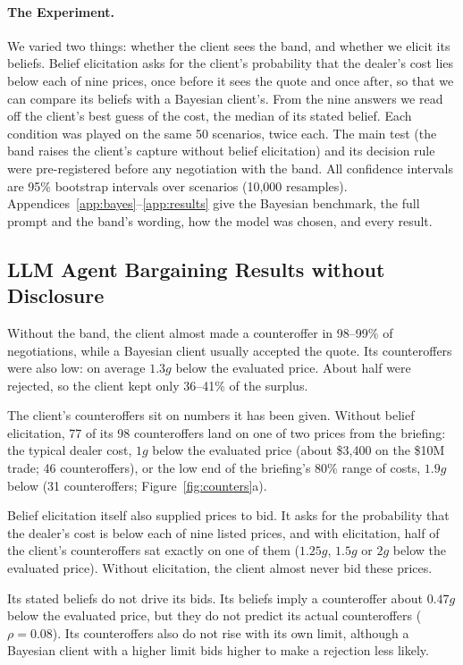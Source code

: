 \documentclass[sigconf]{acmart}
\begin{document}
\paragraph{The Experiment.}
We varied two things: whether the client sees the band, and whether we elicit its beliefs. Belief elicitation asks for the client's probability that the dealer's cost lies below each of nine prices, once before it sees the quote and once after, so that we can compare its beliefs with a Bayesian client's. From the nine answers we read off the client's best guess of the cost, the median of its stated belief. Each condition was played on the same 50 scenarios, twice each. The main test (the band raises the client's capture without belief elicitation) and its decision rule were pre-registered before any negotiation with the band. All confidence intervals are 95\% bootstrap intervals over scenarios (10,000 resamples). Appendices~\ref{app:bayes}--\ref{app:results} give the Bayesian benchmark, the full prompt and the band's wording, how the model was chosen, and every result.


\subsection{LLM Agent Bargaining Results without Disclosure}

Without the band, the client almost made a counteroffer in 98--99\% of negotiations, while a Bayesian client usually accepted the quote. Its counteroffers were also low: on average $1.3g$ below the evaluated price. About half were rejected, so the client kept only 36--41\% of the surplus.

The client's counteroffers sit on numbers it has been given. Without belief elicitation, 77 of its 98 counteroffers land on one of two prices from the briefing: the typical dealer cost, $1g$ below the evaluated price (about \$3,400 on the \$10M trade; 46 counteroffers), or the low end of the briefing's 80\% range of costs, $1.9g$ below (31 counteroffers;
Figure~\ref{fig:counters}a).

Belief elicitation itself also supplied prices to bid. It asks for the probability that the dealer's cost is below each of nine listed prices, and with elicitation, half of the client's counteroffers sat exactly on one of them ($1.25g$, $1.5g$ or $2g$ below the evaluated price). Without elicitation, the client almost never bid these prices.

Its stated beliefs do not drive its bids. Its beliefs imply a counteroffer about $0.47g$ below the evaluated price, but they do not predict its actual counteroffers ($\rho = 0.08$). Its counteroffers also do not rise with its own limit, although a Bayesian client with a higher limit bids higher to make a rejection less likely.
\end{document}
